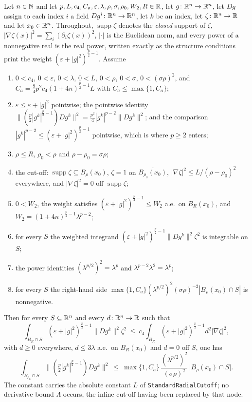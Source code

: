 \begin{helper}
Let $n\in\mathbb{N}$ and let
$p,L,c_4,C_a,\varepsilon,\lambda,\rho,\sigma,\rho_0,W_2,R\in\mathbb{R}$, let
$g\colon\mathbb{R}^n\to\mathbb{R}^n$, let $Dg$ assign to each index $i$ a field
$Dg^i\colon\mathbb{R}^n\to\mathbb{R}^n$, let $k$ be an index, let $\zeta\colon\mathbb{R}^n\to\mathbb{R}$ and
let $x_0\in\mathbb{R}^n$.  Throughout, $\operatorname{supp}\zeta$ denotes the
\emph{closed} support of $\zeta$,
$|\nabla\zeta(x)|^2=\sum_i(\partial_i\zeta(x))^2$, $|\cdot|$ is the Euclidean
norm, and every power of a nonnegative real is the real power, written exactly
as the structure conditions print the weight
$(\varepsilon+|g|^2)^{\frac p2-1}$.  Assume
\begin{enumerate}
\item[(H1)] $0<c_4$, $0<\varepsilon$, $0<\lambda$, $0<L$, $0<\rho$,
  $0<\sigma$, $0<(\sigma\rho)^2$, and
  $C_a=\tfrac94p^2c_4(1+4n)^{\frac p2-1}L$ with $C_a\le\max\{1,C_a\}$;
\item[(H2)] $\varepsilon\le\varepsilon+|g|^2$ pointwise; the pointwise identity
  $\bigl\|(\tfrac p2|g^k|^{\frac p2-1})Dg^k\bigr\|^2
    =\tfrac{p^2}4|g^k|^{p-2}\|Dg^k\|^2$; and the comparison
  $|g^k|^{p-2}\le(\varepsilon+|g|^2)^{\frac p2-1}$ pointwise, which is where
  $p\ge2$ enters;
\item[(H3)] $\rho\le R$, $\rho_0<\rho$ and $\rho-\rho_0=\sigma\rho$;
\item[(H4)] the cut-off: $\operatorname{supp}\zeta\subseteq B_\rho(x_0)$,
  $\zeta=1$ on $\overline{B_{\rho_0}(x_0)}$,
  $|\nabla\zeta|^2\le L/(\rho-\rho_0)^2$ everywhere, and $|\nabla\zeta|^2=0$
  off $\operatorname{supp}\zeta$;
\item[(H5)] $0<W_2$, the weight satisfies
  $(\varepsilon+|g|^2)^{\frac p2-1}\le W_2$ a.e.\ on $B_R(x_0)$, and
  $W_2=(1+4n)^{\frac p2-1}\lambda^{p-2}$;
\item[(H6)] for every $S$ the weighted integrand
  $(\varepsilon+|g|^2)^{\frac p2-1}\|Dg^k\|^2\zeta^2$ is integrable on $S$;
\item[(H7)] the power identities $(\lambda^{p/2})^2=\lambda^{p}$ and
  $\lambda^{p-2}\lambda^2=\lambda^{p}$;
\item[(H8)] for every $S$ the right-hand side
  $\max\{1,C_a\}(\lambda^{p/2})^2(\sigma\rho)^{-2}|B_\rho(x_0)\cap S|$ is
  nonnegative.
\end{enumerate}
Then for every $S\subseteq\mathbb{R}^n$ and every $d\colon\mathbb{R}^n\to\mathbb{R}$ such that
\[
\int_{B_R\cap S}(\varepsilon+|g|^2)^{\frac p2-1}\|Dg^k\|^2\zeta^2
\ \le\ c_4\int_{B_R}(\varepsilon+|g|^2)^{\frac p2-1}d^2|\nabla\zeta|^2,
\]
with $d\ge0$ everywhere, $d\le3\lambda$ a.e.\ on $B_R(x_0)$ and $d=0$ off $S$,
one has
\[
\int_{B_{\rho_0}\cap S}\bigl\|(\tfrac p2|g^k|^{\frac p2-1})Dg^k\bigr\|^2
\ \le\ \max\{1,C_a\}\,\frac{(\lambda^{p/2})^2}{(\sigma\rho)^2}\,
  \bigl|B_\rho(x_0)\cap S\bigr| .
\]
The constant carries the absolute constant $L$ of
\texttt{StandardRadialCutoff}; no derivative bound $\Lambda$ occurs, the
inline cut-off having been replaced by that node.
\end{helper}
